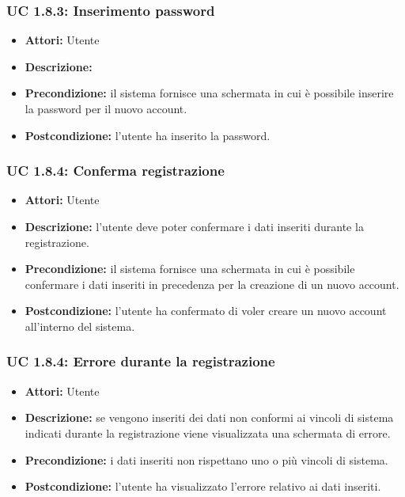 \subsubsection{UC 1.8.3: Inserimento password}

\begin{itemize}
\item \textbf{Attori:} Utente
\item \textbf{Descrizione:} 
\item \textbf{Precondizione:} il sistema fornisce una schermata in cui è possibile inserire la password per il nuovo account.
\item \textbf{Postcondizione:} l'utente ha inserito la password.
\end{itemize}

\subsubsection{UC 1.8.4: Conferma registrazione}

\begin{itemize}
\item \textbf{Attori:} Utente
\item \textbf{Descrizione:} l'utente deve poter confermare i dati inseriti durante la registrazione.
\item \textbf{Precondizione:} il sistema fornisce una schermata in cui è possibile confermare i dati inseriti in precedenza per la creazione di un nuovo account.
\item \textbf{Postcondizione:} l'utente ha confermato di voler creare un nuovo account all'interno
del sistema.
\end{itemize}

\subsubsection{UC 1.8.4: Errore durante la registrazione}

\begin{itemize}
\item \textbf{Attori:} Utente
\item \textbf{Descrizione:} se vengono inseriti dei dati non conformi ai vincoli di sistema indicati durante la registrazione viene visualizzata una schermata di errore. 
\item \textbf{Precondizione:} i dati inseriti non rispettano uno o più vincoli di sistema.
\item \textbf{Postcondizione:} l'utente ha visualizzato l'errore relativo ai dati inseriti.
\end{itemize}



